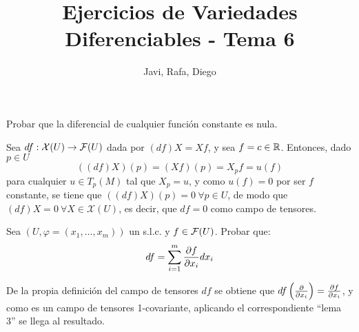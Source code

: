 \documentclass[twoside]{article}
\newcounter{ejercicio}
\begin{document}
\title{Ejercicios de Variedades Diferenciables - Tema 6}
\author{Javi, Rafa, Diego}
\maketitle

\begin{ejercicio}{1}
Probar que la diferencial de cualquier función constante es nula.
\end{ejercicio}
\begin{solucion}
Sea $df:\mathcal{X}(U)\to\mathcal{F}(U)$ dada por $(df)X=Xf$, y sea $f=c\in\mathbb{R}$. Entonces, dado $p\in U$
$$((df)X)(p)=(Xf)(p)=X_pf=u(f)$$
para cualquier $u\in T_p(M)$ tal que $X_p=u$, y como $u(f)=0$ por ser $f$ constante, se tiene que $((df)X)(p)=0\ \forall p\in U$, de modo que $(df)X=0\ \forall X\in\mathcal{X}(U)$, es decir, que $df=0$ como campo de tensores. 
\end{solucion}

\newpage

\begin{ejercicio}{2}
Sea $(U, \varphi = (x_1, \dots, x_m))$ un s.l.c. y $f \in \mathcal{F}(U)$. Probar que:
$$df =
\sum^m_{i=1}
\frac{\partial f}{\partial x_i}dx_i$$
\end{ejercicio}
\begin{solucion}
De la propia definición del campo de tensores $df$ se obtiene que $df\left(\frac{\partial }{\partial x_i}\right)=\frac{\partial f}{\partial x_i}$, y como es un campo de tensores 1-covariante, aplicando el correspondiente ``lema 3'' se llega al resultado.
\end{solucion}

\newpage

\begin{ejercicio}{3}

\end{ejercicio}
\begin{solucion}
\end{solucion}
\end{document}
